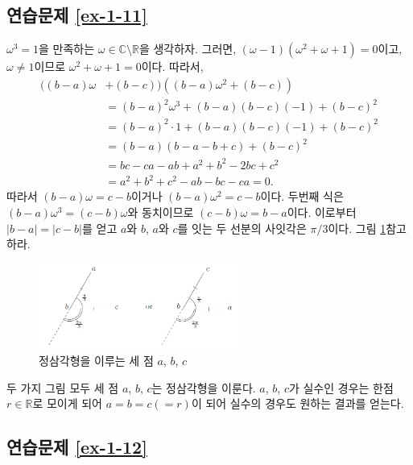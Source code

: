 \subsection*{연습문제 \ref{ex-1-11}}

$\omega^3=1$을 만족하는 $\omega\in\mathbb C \setminus \mathbb R$을 생각하자.
그러면, $(\omega-1)(\omega^2+\omega+1)=0$이고,
$\omega\ne1$이므로 $\omega^2+\omega+1=0$이다.
따라서,
\begin{align*}
((b-a)\omega &+(b-c))((b-a)\omega^2+(b-c)) \\
&= (b-a)^2\omega^3 + (b-a)(b-c)(-1) + (b-c)^2 \\
&= (b-a)^2\cdot 1 + (b-a)(b-c)(-1)  + (b-c)^2 \\
&= (b-a)(b-a-b+c) + (b-c)^2 \\
&=bc-ca-ab+a^2+b^2-2bc+c^2 \\
&= a^2+b^2+c^2 -ab - bc - ca = 0.
\end{align*}
따라서 $(b-a)\omega = c-b$이거나 $(b-a)\omega^2 = c-b$이다.
두번째 식은 $(b-a)\omega^3 = (c-b)\omega$와 동치이므로
$(c-b)\omega = b-a$이다.
이로부터 $|b-a|=|c-b|$를 얻고
$a$와 $b$, $a$와 $c$를 잇는 두 선분의 사잇각은 $\pi/3$이다.
그림 \ref{fig-5-4}\를 참고하라.

\begin{figure}[h!]
\begin{center}
\includegraphics[width=0.6\textwidth]{./Solution/figs/fig-5-4}
\end{center}
\caption{정삼각형을 이루는 세 점 $a$, $b$, $c$}
\label{fig-5-4}
\end{figure}

두 가지 그림 모두 세 점 $a$, $b$, $c$는 정삼각형을 이룬다.
 $a$, $b$, $c$가 실수인 경우는 한점 $r\in\mathbb R$로 모이게 되어
 $a=b=c(=r)$이 되어 실수의 경우도 원하는 결과를 얻는다.

\subsection*{연습문제 \ref{ex-1-12}}

